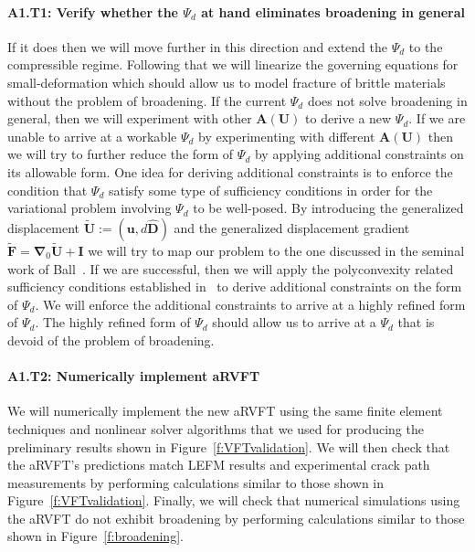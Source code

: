 \documentclass[10pt,letterpaper]{article}
\newcommand{\bs}[1]{\ensuremath{\boldsymbol{#1}}}
\begin{document}
    \paragraph{A1.T1: Verify whether the $\mathsf{\Psi}_d$ at hand eliminates broadening in general}
    If it does then we will move further in this direction and extend the $\mathsf{\Psi}_d$ to the compressible regime.
    Following that we will linearize the governing equations for small-deformation which should allow us to model fracture of brittle materials without the problem of broadening.
    If the current $\mathsf{\Psi}_d$ does not solve broadening in general, then we will experiment with other $\bs{A}(\bs{U})$ to derive a new $\mathsf{\Psi}_d$.
    If we are unable to arrive at a workable $\mathsf{\Psi}_d$ by experimenting with different $\bs{A}(\bs{U})$ then we will try to further reduce the form of $\mathsf{\Psi}_d$ by applying additional constraints on its allowable form.
    One idea for deriving additional constraints is to enforce the condition that $\mathsf{\Psi}_d$ satisfy some type of sufficiency conditions in order for the variational problem involving $\mathsf{\Psi}_d$ to be well-posed.
    By introducing the  generalized displacement $\tilde{\mathbf{U}}:=(\bs{u},d\hat{\mathbf{D}})$ and the generalized displacement gradient $\tilde{\bs{F}}=\bs{\nabla}_{0}\tilde{\bs{U}}+\bs{I}$ we will try to map our problem to the one discussed in the seminal work of Ball~\cite{ball1976convexity}.
    If we are successful, then we will apply the polyconvexity related sufficiency conditions established in~\cite{ball1976convexity} to derive additional constraints on the form of $\mathsf{\Psi}_d$.
    We will enforce the additional constraints to arrive at a highly refined form of $\mathsf{\Psi}_d$.
    The highly refined form of $\mathsf{\Psi}_d$ should allow us to arrive at a $\mathsf{\Psi}_d$ that is devoid of the problem of broadening.

    \paragraph{A1.T2: Numerically implement aRVFT}
    We will numerically implement the new aRVFT using the same finite element techniques and nonlinear solver algorithms that we used for producing the preliminary results shown in Figure~\ref{f:VFTvalidation}.
    We will then check that the aRVFT's predictions match LEFM results and experimental crack path measurements by performing calculations similar to those shown in Figure~\ref{f:VFTvalidation}.
    Finally, we will check that numerical simulations using the aRVFT do not exhibit broadening by performing calculations similar to those shown in Figure~\ref{f:broadening}.
\end{document}
